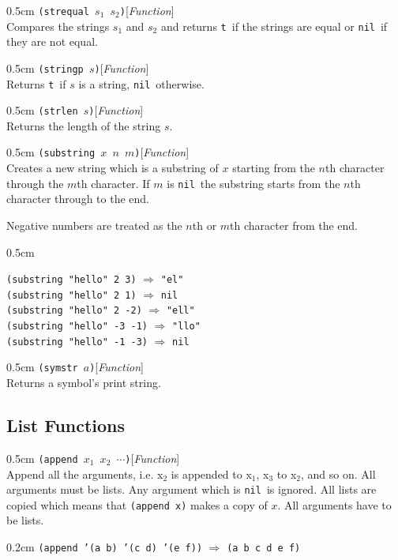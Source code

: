\documentclass[a4paper]{article}
\newcommand{\lisp}[1]{\texttt{#1}}
\newcommand{\T}{\lisp{t}}
\newcommand{\NIL}{\lisp{nil}}
\newcommand{\xargs}{$x_{1}$ $x_{2}$ $\cdots$}
\newenvironment{examples}{
  \newcommand{\ex}[2]{
    \lisp{##1} $\Rightarrow$ \lisp{##2}\\
  }
  \begin{adjustwidth}{0.5cm}{}}{\end{adjustwidth}}
\newenvironment{defun}[2]{\begin{adjustwidth}{0.5cm}{}
    {\hspace*{-0.5cm}\lisp{#2}\hfill[\textit{#1}]\\}}
               {\end{adjustwidth}}
\newcommand{\example}[2]{
  \begin{adjustwidth}{0.2cm}{}
    \lisp{#1} $\Rightarrow$ \lisp{#2}
  \end{adjustwidth}
}
\begin{document}
\begin{defun}{Function}{(strequal $s_{1}$ $s_{2}$)}
  Compares the strings $s_{1}$ and $s_{2}$ and returns \T\ if the
  strings are equal or \NIL\ if they are not equal.
\end{defun}

\begin{defun}{Function}{(stringp $s$)}
  Returns \T\ if $s$ is a string, \NIL\ otherwise.
\end{defun}

\begin{defun}{Function}{(strlen $s$)}
  Returns the length of the string $s$.
\end{defun}

\begin{defun}{Function}{(substring $x$ $n$ $m$)}
  Creates a new string which is a substring of $x$ starting from the
  $n$th character through the $m$th character. If $m$ is \NIL\ the
  substring starts from the $n$th character through to the end.

  Negative numbers are treated as the $n$th or $m$th character from
  the end.

  \begin{examples}
    \ex{(substring "hello" 2 3)}{"el"}
    \ex{(substring "hello" 2 1)}{nil}
    \ex{(substring "hello" 2 -2)}{"ell"}
    \ex{(substring "hello" -3 -1)}{"llo"}
    \ex{(substring "hello" -1 -3)}{nil}
  \end{examples}

\end{defun}


\begin{defun}{Function}{(symstr $a$)}
  Returns a symbol's print string.
\end{defun}

\subsection{List Functions}

\begin{defun}{Function}{(append \xargs)}
  Append all the arguments, i.e. x$_{2}$ is appended to x$_{1}$,
  x$_{3}$ to x$_{2}$, and so on. All arguments must be lists. Any
  argument which is \NIL\ is ignored. All lists are copied which means
  that \lisp{(append x)} makes a copy of $x$. All arguments have to be
  lists.

  \example{(append '(a b) '(c d) '(e f))}{(a b c d e f)}
\end{defun}
\end{document}
